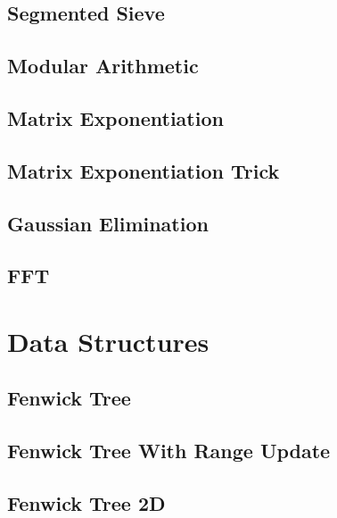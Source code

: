 \subsection{Segmented Sieve}
\raggedbottom
\hrulefill
\subsection{Modular Arithmetic}
\raggedbottom
\hrulefill
\subsection{Matrix Exponentiation}
\raggedbottom
\hrulefill
\subsection{Matrix Exponentiation Trick}
\raggedbottom
\hrulefill
\subsection{Gaussian Elimination}
\raggedbottom
\hrulefill
\subsection{FFT}
\raggedbottom
\hrulefill

\section{Data Structures}
\subsection{Fenwick Tree}
\raggedbottom
\hrulefill
\subsection{Fenwick Tree With Range Update}
\raggedbottom
\hrulefill
\subsection{Fenwick Tree 2D}
\raggedbottom
\hrulefill
